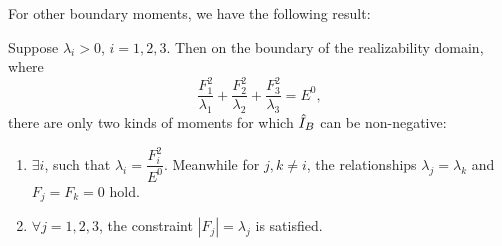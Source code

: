 For other boundary moments, we have the following result:
\begin{lemma}\label{lem:realizable-bound}
  Suppose $\lambda_i > 0$, $i = 1,2,3$.
  Then on the boundary of the realizability domain, where
  \begin{equation}\label{eq:cond-boundary}
    \dfrac{F_1^2}{\lambda_1} + \dfrac{F_2^2}{\lambda_2}
    + \dfrac{F_3^2}{\lambda_3} = E^0,
  \end{equation}
  there are only two kinds of moments for which $\hat I_B$ can be non-negative:
  \begin{enumerate}
    \item   $\exists i$, such that $\lambda_i = \dfrac{F_i^2}{E^0}$.
      Meanwhile for $j,k\not=i$, the relationships $\lambda_j = \lambda_k$  and
      $F_j = F_k = 0$ hold.
    \item $\forall j = 1,2,3$, the constraint $|F_j| = \lambda_j$ is satisfied. 
  \end{enumerate}
\end{lemma}
